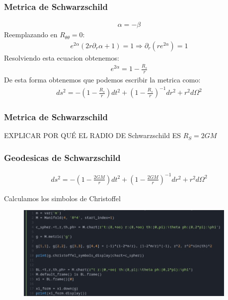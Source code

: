 \documentclass{beamer}
\begin{document}
\begin{frame}
\frametitle{Metrica de Schwarzschild}
\begin{gather*}
  \alpha = - \beta  
\end{gather*}
Reemplazando en $ R _{\theta \theta }  = 0  $: 
\begin{gather*}
  e ^ {2\alpha }(2r \partial_r \alpha + 1 ) = 1 \Longrightarrow \partial_r (r e ^ {2\alpha }) = 1 
\end{gather*}
Resolviendo esta ecuacion obtenemos: 
\begin{gather*}
  e ^ {2\alpha } = 1 - \frac{R_s }{r } 
\end{gather*}
De esta forma obtenemos que podemos escribir la metrica como: 
\begin{gather*}
  ds^2 = - \left(1 - \frac{R_s }{r }\right)dt^2 + \left(1 - \frac{R_s }{r}\right) ^ {-1 } dr^2 + r^2 d \Omega^2  
\end{gather*}
\end{frame}




\begin{frame}
\frametitle{Metrica de Schwarzschild}
EXPLICAR POR QUÉ EL RADIO DE Schwarzschild ES $R_S=2GM$
\end{frame}




\begin{frame}
\frametitle{Geodesicas de Schwarzschild}
\begin{gather*}
  ds^2 = - \left(1 - \frac{2GM }{r }\right)dt^2 + \left(1 - \frac{2GM }{r}\right) ^ {-1 } dr^2 + r^2 d \Omega^2  
\end{gather*}

Calculamos los simbolos de Christoffel
\begin{figure}[H]
  \begin{center}
    \includegraphics[width=0.95\textwidth]{sage.png}
  \end{center}
\end{figure}
\end{frame}
\end{document}
